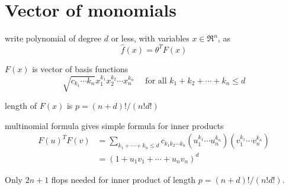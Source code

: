 \section{Vector of monomials}

\begin{definition}
    write polynomial of degree $ d $ or less, with variables $ x \in \mathfrak{R}^{n} $, as
\begin{equation}
\hat{f}(x)=\theta^{T} F(x)
\end{equation}

$ F(x) $ is vector of basis functions
\begin{equation}
\sqrt{c_{k_{1}} \cdots k_{n}} x_{1}^{k_{1}} x_{2}^{k_{2}} \cdots x_{n}^{k_{n}} \quad \text { for all } k_{1}+k_{2}+\cdots+k_{n} \leq d
\end{equation}
\end{definition}

\begin{theorem}
    length of $ F(x) $ is $ p=(n+d) ! /(n ! d !) $
\end{theorem}

\begin{theorem}
    multinomial formula gives simple formula for inner products
    \begin{equation}
    \begin{aligned}
    F(u)^{T} F(v) &=\sum_{k_{1}+\cdots+k_{n} \leq d} c_{k_{1} k_{2} \cdots k_{n}}\left(u_{1}^{k_{1}} \cdots u_{n}^{k_{n}}\right)\left(v_{1}^{k_{1}} \cdots v_{n}^{k_{n}}\right) \\
    &=\left(1+u_{1} v_{1}+\cdots+u_{n} v_{n}\right)^{d}
    \end{aligned}
    \end{equation}
\end{theorem}


Only $ 2 n+1 $ flops needed for inner product of length $ p=(n+d) ! /(n ! d !) $.

